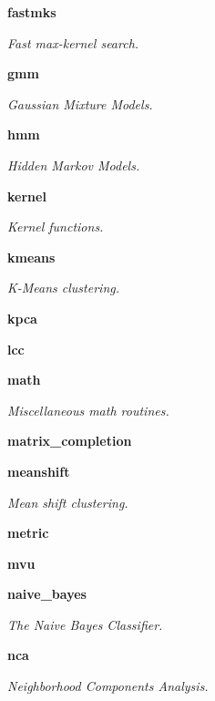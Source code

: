 \begin{DoxyCompactItemize}
 {\bf fastmks}
\begin{DoxyCompactList}\small\item\em Fast max-\/kernel search. \end{DoxyCompactList}\item 
 {\bf gmm}
\begin{DoxyCompactList}\small\item\em Gaussian Mixture Models. \end{DoxyCompactList}\item 
 {\bf hmm}
\begin{DoxyCompactList}\small\item\em Hidden Markov Models. \end{DoxyCompactList}\item 
 {\bf kernel}
\begin{DoxyCompactList}\small\item\em Kernel functions. \end{DoxyCompactList}\item 
 {\bf kmeans}
\begin{DoxyCompactList}\small\item\em K-\/\+Means clustering. \end{DoxyCompactList}\item 
 {\bf kpca}
\item 
 {\bf lcc}
\item 
 {\bf math}
\begin{DoxyCompactList}\small\item\em Miscellaneous math routines. \end{DoxyCompactList}\item 
 {\bf matrix\+\_\+completion}
\item 
 {\bf meanshift}
\begin{DoxyCompactList}\small\item\em Mean shift clustering. \end{DoxyCompactList}\item 
 {\bf metric}
\item 
 {\bf mvu}
\item 
 {\bf naive\+\_\+bayes}
\begin{DoxyCompactList}\small\item\em The Naive Bayes Classifier. \end{DoxyCompactList}\item 
 {\bf nca}
\begin{DoxyCompactList}\small\item\em Neighborhood Components Analysis. \end{DoxyCompactList}\item 

\end{DoxyCompactItemize}

